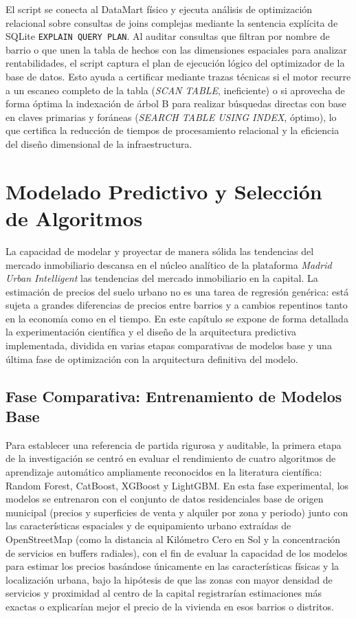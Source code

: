 \documentclass[a4paper,11pt,openany]{book}
\begin{document}
El script se conecta al DataMart físico y ejecuta análisis de optimización relacional sobre consultas de joins complejas mediante la sentencia explícita de SQLite \texttt{EXPLAIN QUERY PLAN}. Al auditar consultas que filtran por nombre de barrio o que unen la tabla de hechos con las dimensiones espaciales para analizar rentabilidades, el script captura el plan de ejecución lógico del optimizador de la base de datos. Esto ayuda a certificar mediante trazas técnicas si el motor recurre a un escaneo completo de la tabla (\textit{SCAN TABLE}, ineficiente) o si aprovecha de forma óptima la indexación de árbol B para realizar búsquedas directas con base en claves primarias y foráneas (\textit{SEARCH TABLE USING INDEX}, óptimo), lo que certifica la reducción de tiempos de procesamiento relacional y la eficiencia del diseño dimensional de la infraestructura.


\chapter{Modelado Predictivo y Selección de Algoritmos}
\label{chap:predictive_modeling}
La capacidad de modelar y proyectar de manera sólida las tendencias del mercado inmobiliario descansa en el núcleo analítico de la plataforma \textit{Madrid Urban Intelligent} las tendencias del mercado inmobiliario en la capital. La estimación de precios del suelo urbano no es una tarea de regresión genérica: está sujeta a grandes diferencias de precios entre barrios y a cambios repentinos tanto en la economía como en el tiempo. En este capítulo se expone de forma detallada la experimentación científica y el diseño de la arquitectura predictiva implementada, dividida en varias etapas comparativas de modelos base y una última fase de optimización con la arquitectura definitiva del modelo.

\section{Fase Comparativa: Entrenamiento de Modelos Base}
\label{sec:fase_comparativa}
Para establecer una referencia de partida rigurosa y auditable, la primera etapa de la investigación se centró en evaluar el rendimiento de cuatro algoritmos de aprendizaje automático ampliamente reconocidos en la literatura científica: Random Forest, CatBoost, XGBoost y LightGBM. En esta fase experimental, los modelos se entrenaron con el conjunto de datos residenciales base de origen municipal (precios y superficies de venta y alquiler por zona y periodo) junto con las características espaciales y de equipamiento urbano extraídas de OpenStreetMap (como la distancia al Kilómetro Cero en Sol y la concentración de servicios en buffers radiales), con el fin de evaluar la capacidad de los modelos para estimar los precios basándose únicamente en las características físicas y la localización urbana, bajo la hipótesis de que las zonas con mayor densidad de servicios y proximidad al centro de la capital registrarían estimaciones más exactas o explicarían mejor el precio de la vivienda en esos barrios o distritos.
\end{document}
